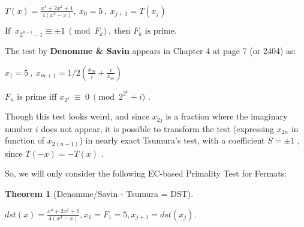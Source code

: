 \documentclass[latin1]{quadrature}
\newtheorem{theorem}{Theorem}
\newif\ifenfrancais
\begin{document}
\begin{article}
\begin{article}
$T(x)= \frac{\displaystyle x^4+2x^2+1}{\displaystyle 4(x^3-x)} , \   x_0=5 \ , \   x_{j+1} = T(x_j) $

\vspace{.02in}
\ifenfrancais
$\text{Si } \ x_{2^{k-1}-1} \equiv \pm 1 \ \pmod{F_k} \ , \ \text{alors } F_k \text{ est premier} .$
\else
$\text{If } \ x_{2^{k-1}-1} \equiv \pm 1 \ \pmod{F_k} \ , \ \text{then } F_k \text{ is prime} .$
\fi

\vspace{.1in}

\ifenfrancais
Le test prouv\'e par \textbf{Denomme \& Savin} appara\^it au chapitre 4 \`a la page 7 (ou 2404) comme :
\else
The test by \textbf{Denomme \& Savin} appears in Chapter 4 at page 7 (or 2404) as:
\fi

\vspace{.04in}
$x_1 = 5 \ , \ x_{m+1} = 1/2 \left( \frac{\displaystyle x_m}{\displaystyle i} + \frac{\displaystyle i}{\displaystyle x_m} \right) $

\vspace{.02in}
\ifenfrancais
$F_n  \text{ est premier ssi } x_{2^k} \  \equiv \ 0 \ \pmod{2^{2^k}+i}$ .
\else
$F_n  \text{ is prime iff } x_{2^k} \  \equiv \ 0 \ \pmod{2^{2^k}+i}$ .
\fi

\vspace{.1in}

\ifenfrancais
Bien que ce test semble assez bizarre, et parce que $x_{2j}$ est une fraction o\`u le nombre imaginaire $i$ n'appara\^it pas, il est possible de transformer le test (en exprimant $x_{2n}$ en fonction de $x_{2(n-1)}$) dans une forme presque identique au test de Tsumura's, avec un coefficient $S = \pm 1$ , puisque $T(-x) = - T(x)$ .
\else
Though this test looks weird, and since $x_{2j}$ is a fraction where the imaginary number $i$ does not appear, it is possible to transform the test (expressing $x_{2n}$ in function of $x_{2(n-1)}$)  in nearly exact Tsumura's test, with a coefficient $S = \pm 1$ , since $T(-x) = - T(x)$ .
\fi

\vspace{.1in}

\ifenfrancais
Aussi, nous ne consid\'erons i\c{c}i que le test de primalit\'e suivant :
\else
So, we will only consider the following EC-based Primality Test for Fermats:
\fi

\ifenfrancais
\begin{theorem}[Denomme/Savin - Tsumura = DST]
\ 
\vspace{.04in}

$dst(x)= \frac{\displaystyle x^4+2x^2+1}{\displaystyle 4(x^3-x)} , x_1=F_1=5, x_{j+1} = dst(x_j)$.


\end{theorem}
\end{article}
\end{article}
\end{document}
